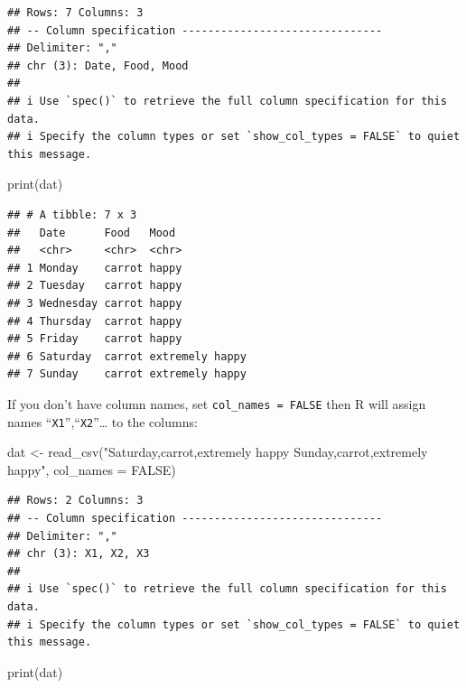 \documentclass[
  12pt,
]{krantz}
\makeatletter
\newenvironment{Shaded}{\begin{snugshade}}{\end{snugshade}}
\newcommand{\AttributeTok}[1]{\textcolor[rgb]{0.61,0.61,0.61}{#1}}
\newcommand{\ConstantTok}[1]{\textcolor[rgb]{0,0,0}{#1}}
\newcommand{\FunctionTok}[1]{\textcolor[rgb]{0,0,0}{#1}}
\newcommand{\NormalTok}[1]{#1}
\newcommand{\OtherTok}[1]{\textcolor[rgb]{0.37,0.37,0.37}{#1}}
\newcommand{\StringTok}[1]{\textcolor[rgb]{0.5,0.5,0.5}{#1}}
\newenvironment{kframe}{%
\medskip{}
\setlength{\fboxsep}{.8em}
 \def\at@end@of@kframe{}%
 \ifinner\ifhmode%
  \def\at@end@of@kframe{\end{minipage}}%
  \begin{minipage}{\columnwidth}%
 \fi\fi%
 \def\FrameCommand##1{\hskip\@totalleftmargin \hskip-\fboxsep
 \colorbox{shadecolor}{##1}\hskip-\fboxsep
     \hskip-\linewidth \hskip-\@totalleftmargin \hskip\columnwidth}%
 \MakeFramed {\advance\hsize-\width
   \@totalleftmargin\z@ \linewidth\hsize
   \@setminipage}}%
 {\par\unskip\endMakeFramed%
 \at@end@of@kframe}
\renewenvironment{Shaded}{\begin{kframe}}{\end{kframe}}
\makeatother
\begin{document}
\begin{verbatim}
## Rows: 7 Columns: 3
## -- Column specification -------------------------------
## Delimiter: ","
## chr (3): Date, Food, Mood
## 
## i Use `spec()` to retrieve the full column specification for this data.
## i Specify the column types or set `show_col_types = FALSE` to quiet this message.
\end{verbatim}

\begin{Shaded}
\begin{Highlighting}[]
\FunctionTok{print}\NormalTok{(dat)}
\end{Highlighting}
\end{Shaded}

\begin{verbatim}
## # A tibble: 7 x 3
##   Date      Food   Mood           
##   <chr>     <chr>  <chr>          
## 1 Monday    carrot happy          
## 2 Tuesday   carrot happy          
## 3 Wednesday carrot happy          
## 4 Thursday  carrot happy          
## 5 Friday    carrot happy          
## 6 Saturday  carrot extremely happy
## 7 Sunday    carrot extremely happy
\end{verbatim}

If you don't have column names, set \texttt{col\_names\ =\ FALSE} then R will assign names ``\texttt{X1}'',``\texttt{X2}''\ldots{} to the columns:

\begin{Shaded}
\begin{Highlighting}[]
\NormalTok{dat }\OtherTok{\textless{}{-}} \FunctionTok{read\_csv}\NormalTok{(}\StringTok{"Saturday,carrot,extremely happy}
\StringTok{          Sunday,carrot,extremely happy"}\NormalTok{, }\AttributeTok{col\_names =} \ConstantTok{FALSE}\NormalTok{)}
\end{Highlighting}
\end{Shaded}

\begin{verbatim}
## Rows: 2 Columns: 3
## -- Column specification -------------------------------
## Delimiter: ","
## chr (3): X1, X2, X3
## 
## i Use `spec()` to retrieve the full column specification for this data.
## i Specify the column types or set `show_col_types = FALSE` to quiet this message.
\end{verbatim}

\begin{Shaded}
\begin{Highlighting}[]
\FunctionTok{print}\NormalTok{(dat)}
\end{Highlighting}
\end{Shaded}
\end{document}
